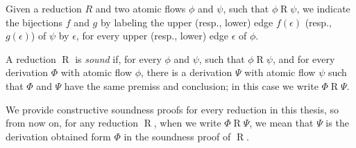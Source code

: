 \begin{remark}\label{remark:LabelBijectionEdges}
Given a reduction $R$ and two atomic flows $\phi$ and $\psi$, such that $\phi\mathrel{R}\psi$, we indicate the bijections $f$ and $g$ by labeling the upper (resp., lower) edge $f(\epsilon)$ (resp., $g(\epsilon)$) of $\psi$ by $\epsilon$, for every upper (resp., lower) edge $\epsilon$ of $\phi$.
\end{remark}

\begin{definition}\label{definition:SoundRedcution}
A reduction $\mathrel{R}$ is \emph{sound} if, for every $\phi$ and $\psi$, such that $\phi\mathrel{R}\psi$, and for every derivation $\Phi$ with atomic flow $\phi$, there is a derivation $\Psi$ with atomic flow $\psi$ such that $\Phi$ and $\Psi$ have the same premiss and conclusion; in this case we write $\Phi\mathrel{R}\Psi$.
\end{definition}

\begin{convention}
We provide constructive soundness proofs for every reduction in this thesis, so from now on, for any reduction $\mathrel{R}$, when we write $\Phi\mathrel{R}\Psi$, we mean that $\Psi$ is the derivation obtained form $\Phi$ in the soundness proof of $\mathrel{R}$.
\end{convention}

